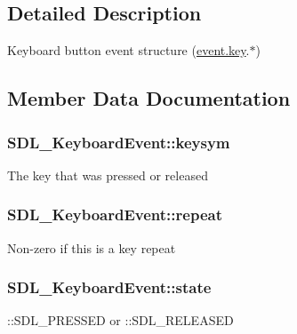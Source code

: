 \subsection{Detailed Description}
Keyboard button event structure (\hyperlink{union_s_d_l___event_ab99927835cc77a9b6bb50b419b4a27df}{event.\+key}.$\ast$) 

\subsection{Member Data Documentation}
\hypertarget{struct_s_d_l___keyboard_event_a2a57ba820a298f2c02ad5d41fd2b1aa8}{}
\subsubsection[{keysym}]{ S\+D\+L\+\_\+\+Keyboard\+Event\+::keysym}\label{struct_s_d_l___keyboard_event_a2a57ba820a298f2c02ad5d41fd2b1aa8}
The key that was pressed or released \hypertarget{struct_s_d_l___keyboard_event_a3edac3b36304812d533795c9df4ed4c1}{}
\subsubsection[{repeat}]{ S\+D\+L\+\_\+\+Keyboard\+Event\+::repeat}\label{struct_s_d_l___keyboard_event_a3edac3b36304812d533795c9df4ed4c1}
Non-\/zero if this is a key repeat \hypertarget{struct_s_d_l___keyboard_event_a110558eb96c113c86cfa31a7018c2346}{}
\subsubsection[{state}]{ S\+D\+L\+\_\+\+Keyboard\+Event\+::state}\label{struct_s_d_l___keyboard_event_a110558eb96c113c86cfa31a7018c2346}
\+::\+S\+D\+L\+\_\+\+P\+R\+E\+S\+S\+E\+D or \+::\+S\+D\+L\+\_\+\+R\+E\+L\+E\+A\+S\+E\+D \hypertarget{struct_s_d_l___keyboard_event_ae0b2f2aace6f80c1f47e5a14350d409a}{}
